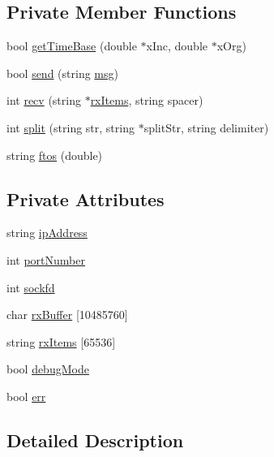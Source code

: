 \subsection*{Private Member Functions}
\begin{DoxyCompactItemize}
\item 
bool \hyperlink{classMSOxxxx_a9723e9234403d5eb74bde628fd78d56c}{get\+Time\+Base} (double $\ast$x\+Inc, double $\ast$x\+Org)
\item 
bool \hyperlink{classMSOxxxx_ae77668a1ae4ccb74e0ed5f2485dfdebf}{send} (string \hyperlink{classObject_a58b2d0618c2d08cf2383012611528d97}{msg})
\item 
int \hyperlink{classMSOxxxx_aa02e46a61e287ef1f5377e9e42399faf}{recv} (string $\ast$\hyperlink{classMSOxxxx_a847cae37181e9ec5f481edcc3fb19b1a}{rx\+Items}, string spacer)
\item 
int \hyperlink{classMSOxxxx_a46726c6d181a758bb4f598c66f336236}{split} (string str, string $\ast$split\+Str, string delimiter)
\item 
string \hyperlink{classMSOxxxx_ab9c897c3dc0a52cbe5a5da67fc520ed7}{ftos} (double)
\end{DoxyCompactItemize}
\subsection*{Private Attributes}
\begin{DoxyCompactItemize}
\item 
string \hyperlink{classMSOxxxx_aa55bdb0feb799b195628fe6ef0222b62}{ip\+Address}
\item 
int \hyperlink{classMSOxxxx_a242bcf72c701cd20d86d25315fc6180f}{port\+Number}
\item 
int \hyperlink{classMSOxxxx_acf030a8f1ddd78d632816c856f50455c}{sockfd}
\item 
char \hyperlink{classMSOxxxx_a1a50770759caada18087ca8ffb96f357}{rx\+Buffer} \mbox{[}10485760\mbox{]}
\item 
string \hyperlink{classMSOxxxx_a847cae37181e9ec5f481edcc3fb19b1a}{rx\+Items} \mbox{[}65536\mbox{]}
\item 
bool \hyperlink{classMSOxxxx_a826ba82e93bbe5780169107a31dbfd29}{debug\+Mode}
\item 
bool \hyperlink{classMSOxxxx_af0af7ac8123ee93917d0e92ec947acaa}{err}
\end{DoxyCompactItemize}


\subsection{Detailed Description}


